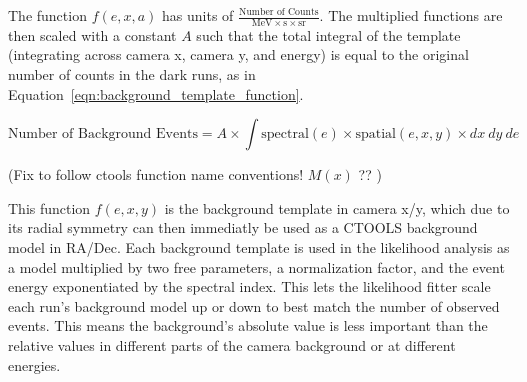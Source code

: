     The function $f(e,x,a)$ has units of $\frac{\textrm{Number of Counts}}{ \textrm{MeV} \times \textrm{s} \times \textrm{sr} }$.
    The multiplied functions are then scaled with a constant $A$ such that the total integral of the template (integrating across camera x, camera y, and energy) is equal to the original number of counts in the dark runs, as in Equation~\ref{eqn:background_template_function}.
    
    \begin{equation}\label{eqn:background_template_function}
      \textrm{Number of Background Events} = A \times \int \textrm{spectral}(e) \times \textrm{spatial}(e,x,y) \times dx \: dy \: de
    \end{equation}
    
    {\color{red}(Fix to follow ctools function name conventions! $M(x)$ ?? )}

    This function $f(e,x,y)$ is the background template in camera x/y, which due to its radial symmetry can then immediatly be used as a CTOOLS background model in RA/Dec.
    Each background template is used in the likelihood analysis as a model multiplied by two free parameters, a normalization factor, and the event energy exponentiated by the spectral index.
    This lets the likelihood fitter scale each run's background model up or down to best match the number of observed events.
    This means the background's absolute value is less important than the relative values in different parts of the camera background or at different energies.
  
  \FloatBarrier

